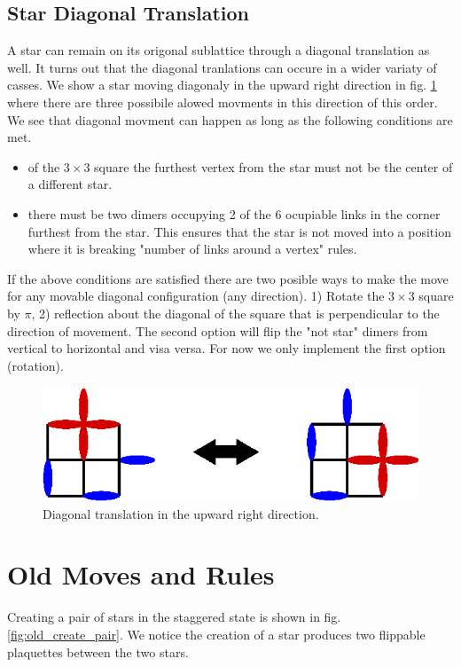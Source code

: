 \documentclass[aps,floatfix,11pt]{revtex4-1}
\begin{document}
\subsection{Star Diagonal Translation}
A star can remain on its origonal sublattice through a diagonal translation as well. It turns out
that the diagonal tranlations can occure in a wider variaty of casses. We show a star moving
diagonaly in the upward right direction in fig. \ref{fig:diag} where there are three possibile
alowed movments in this direction of this order. We see that diagonal movment can happen as long as
the following conditions are met.

\begin{itemize}
    \item of the $3\times 3$ square the furthest vertex from the star must not be the center of a
        different star.
    \item there must be two dimers occupying 2 of the 6 ocupiable links in the corner furthest from
        the star. This ensures that the star is not moved into a position where it is breaking
        "number of links around a vertex" rules.
\end{itemize}

\noindent
If the above conditions are satisfied there are two posible ways to make the move for any movable
diagonal configuration (any direction). 1) Rotate the $3\times3$ square by $\pi$, 2) reflection
about the diagonal of the square that is perpendicular to the direction of movement. The second
option will flip the "not star" dimers from vertical to horizontal and visa versa. For now we only
implement the first option (rotation).

\begin{figure}[h]
    \centering
    \includegraphics[width=8.5 cm]{diag}
    \caption{Diagonal translation in the upward right direction.
\label{fig:diag}}
\end{figure}


\section{Old Moves and Rules}

Creating a pair of stars in the staggered state is shown in fig. \ref{fig:old_create_pair}. We notice
the creation of a star produces two flippable plaquettes between the two stars.
\end{document}
